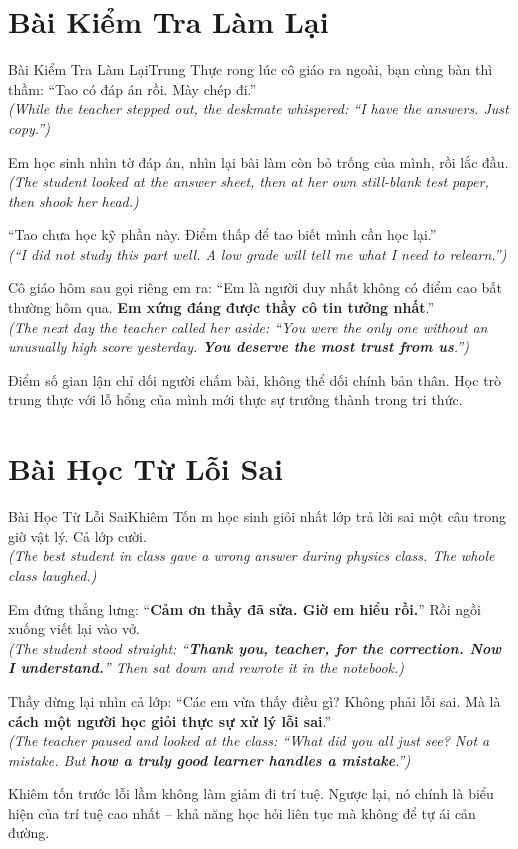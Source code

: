 \section{Bài Kiểm Tra Làm Lại}
\begin{truyen}{Bài Kiểm Tra Làm Lại}{Trung Thực}
rong lúc cô giáo ra ngoài, bạn cùng bàn thì thầm: ``Tao có đáp án rồi. Mày chép đi.''\\
\textit{(While the teacher stepped out, the deskmate whispered: ``I have the answers. Just copy.'')}

Em học sinh nhìn tờ đáp án, nhìn lại bài làm còn bỏ trống của mình, rồi lắc đầu.\\
\textit{(The student looked at the answer sheet, then at her own still-blank test paper, then shook her head.)}

``Tao chưa học kỹ phần này. Điểm thấp để tao biết mình cần học lại.''\\
\textit{(``I did not study this part well. A low grade will tell me what I need to relearn.'')}

Cô giáo hôm sau gọi riêng em ra: ``Em là người duy nhất không có điểm cao bất thường hôm qua. \textbf{Em xứng đáng được thầy cô tin tưởng nhất}.''\\
\textit{(The next day the teacher called her aside: ``You were the only one without an unusually high score yesterday. \textbf{You deserve the most trust from us}.'')}
\end{truyen}
\begin{baihoc}
  Điểm số gian lận chỉ dối người chấm bài, không thể dối chính bản thân. Học trò trung thực với lỗ hổng của mình mới thực sự trưởng thành trong tri thức.
\end{baihoc}

\section{Bài Học Từ Lỗi Sai}
\begin{truyen}{Bài Học Từ Lỗi Sai}{Khiêm Tốn}
m học sinh giỏi nhất lớp trả lời sai một câu trong giờ vật lý. Cả lớp cười.\\
\textit{(The best student in class gave a wrong answer during physics class. The whole class laughed.)}

Em đứng thẳng lưng: ``\textbf{Cảm ơn thầy đã sửa. Giờ em hiểu rồi.}'' Rồi ngồi xuống viết lại vào vở.\\
\textit{(The student stood straight: ``\textbf{Thank you, teacher, for the correction. Now I understand.}'' Then sat down and rewrote it in the notebook.)}

Thầy dừng lại nhìn cả lớp: ``Các em vừa thấy điều gì? Không phải lỗi sai. Mà là \textbf{cách một người học giỏi thực sự xử lý lỗi sai}.''\\
\textit{(The teacher paused and looked at the class: ``What did you all just see? Not a mistake. But \textbf{how a truly good learner handles a mistake}.'')}
\end{truyen}
\begin{baihoc}
  Khiêm tốn trước lỗi lầm không làm giảm đi trí tuệ. Ngược lại, nó chính là biểu hiện của trí tuệ cao nhất – khả năng học hỏi liên tục mà không để tự ái cản đường.
\end{baihoc}

